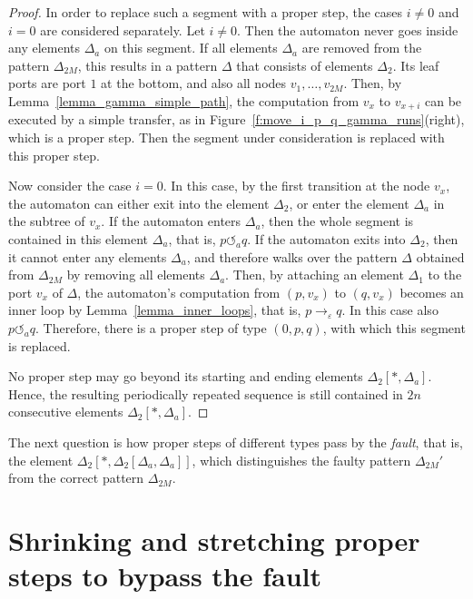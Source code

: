 \documentclass[12pt,a4paper]{article}
\theoremstyle{definition}
\renewcommand{\epsilon}{\varepsilon}
\begin{document}
\begin{proof}
In order to replace such a segment with a proper step,
the cases $i \neq 0$ and $i=0$ are considered separately.
Let $i \neq 0$.
Then the automaton never goes inside any elements $\Delta_a$ on this segment.
If all elements $\Delta_a$ are removed from the pattern $\Delta_{2M}$,
this results in a pattern $\Delta$ that consists of elements $\Delta_2$.
Its leaf ports are port $1$ at the bottom, and also all nodes $v_1, \ldots, v_{2M}$.
Then, by Lemma~\ref{lemma_gamma_simple_path}, the computation from $v_x$ to $v_{x+i}$
can be executed by a simple transfer, as in Figure~\ref{f:move_i_p_q_gamma_runs}(right),
which is a proper step.
Then the segment under consideration is replaced with this proper step.

Now consider the case $i = 0$.
In this case, by the first transition at the node $v_x$,
the automaton can either exit into the element $\Delta_2$,
or enter the element $\Delta_a$ in the subtree of $v_x$.
If the automaton enters $\Delta_a$,
then the whole segment is contained in this element $\Delta_a$,
that is, $p \circlearrowleft_a q$.
If the automaton exits into $\Delta_2$,
then it cannot enter any elements $\Delta_a$,
and therefore walks over the pattern $\Delta$
obtained from $\Delta_{2M}$ by removing all elements $\Delta_a$.
Then, by attaching an element $\Delta_1$ to the port $v_x$ of $\Delta$,
the automaton's computation from $(p,v_x)$ to $(q,v_x)$
becomes an inner loop by Lemma~\ref{lemma_inner_loops},
that is, $p \to_\epsilon q$.
In this case also $p \circlearrowleft_a q$.
Therefore, there is a proper step of type $(0, p, q)$,
with which this segment is replaced.

No proper step may go beyond its starting and ending elements $\Delta_2[*, \Delta_a]$.
Hence, the resulting periodically repeated sequence
is still contained in $2n$ consecutive elements $\Delta_2[*,\Delta_a]$.
\end{proof}

The next question is how proper steps of different types
pass by the \emph{fault}, that is,
the element $\Delta_2[*,\Delta_2[\Delta_a,\Delta_a]]$,
which distinguishes the faulty pattern $\Delta_{2M}'$
from the correct pattern $\Delta_{2M}$.






\section{Shrinking and stretching proper steps to bypass the fault}\label{section_stretched_and_shrunk_moves}
\end{document}
